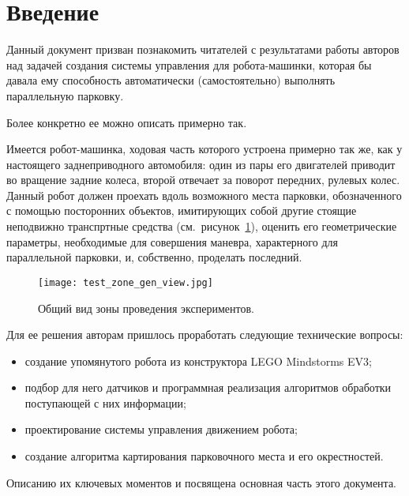 \section*{Введение}
Данный документ призван познакомить читателей с результатами работы авторов над задачей создания системы управления для робота-машинки, которая бы давала ему способность автоматически (самостоятельно) выполнять параллельную парковку.

Более конкретно ее можно описать примерно так.

Имеется робот-машинка, ходовая часть которого устроена примерно так же, как у настоящего заднеприводного автомобиля: один из пары его двигателей приводит во вращение задние колеса, второй отвечает за поворот передних, рулевых колес.
Данный робот должен проехать вдоль возможного места парковки, обозначенного с помощью посторонних объектов, имитирующих собой другие стоящие неподвижно транспртные средства (см.~рисунок~\ref{img_test_zone_gen_view}), оценить его геометрические параметры, необходимые для совершения маневра, характерного для параллельной парковки, и, собственно, проделать последний.

\begin{figure}[h]
    \centering
    \texttt{[image: test\_zone\_gen\_view.jpg]}
    \caption{Общий вид зоны проведения экспериментов.}
    \label{img_test_zone_gen_view}
\end{figure}

Для ее решения авторам пришлось проработать следующие технические вопросы:
\begin{itemize}
    \item создание упомянутого робота из конструктора LEGO Mindstorms EV3;
    \item подбор для него датчиков и программная реализация алгоритмов обработки поступающей с них информации;
    \item проектирование системы управления движением робота;
    \item создание алгоритма картирования парковочного места и его окрестностей.
\end{itemize}
Описанию их ключевых моментов и посвящена основная часть этого документа.


\newpage
